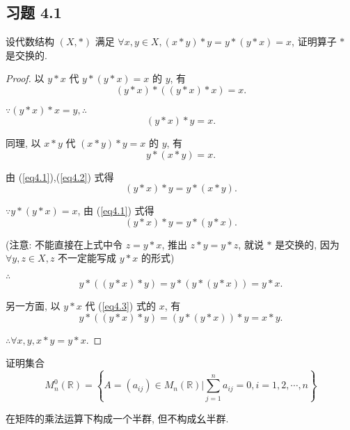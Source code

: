 \documentclass{ctexart}
\begin{document}
\subsection{习题 4.1}
\begin{exercise}[1.1]
    设代数结构 $(X,*)$ 满足 $\forall x,y\in X,(x*y)*y=y*(y*x)=x$, 证明算子 $*$ 是交换的.
\end{exercise}
\begin{proof}
    以 $y*x$ 代 $y*(y*x)=x$ 的 $y$, 有
    \[(y*x)*((y*x)*x)=x.\]

    $\because(y*x)*x=y,\therefore$
    \begin{equation}\label{eq4.1}
        (y*x)*y=x.
    \end{equation}

    同理, 以 $x*y$ 代 $(x*y)*y=x$ 的 $y$, 有
    \begin{equation}\label{eq4.2}
        y*(x*y)=x.
    \end{equation}

    由 (\ref{eq4.1}),(\ref{eq4.2}) 式得
    \begin{equation}\label{eq4.3}
        (y*x)*y=y*(x*y).
    \end{equation}

    $\because y*(y*x)=x$, 由 (\ref{eq4.1}) 式得
    \[(y*x)*y=y*(y*x).\]

    (注意: 不能直接在上式中令 $z=y*x$, 推出 $z*y=y*z$, 就说 $*$ 是交换的, 因为 $\forall y,z\in X,z$ 不一定能写成 $y*x$ 的形式)

    $\therefore$
    \[y*((y*x)*y)=y*(y*(y*x))=y*x.\]

    另一方面, 以 $y*x$ 代 (\ref{eq4.3}) 式的 $x$, 有
    \[y*((y*x)*y)=(y*(y*x))*y=x*y.\]

    $\therefore\forall x,y,x*y=y*x$.
\end{proof}
\begin{exercise}[1.2]
    证明集合
    \[M_n^0(\mathbb{R})=\left\{A=(a_{ij})\in M_n(\mathbb{R})\Bigg|\sum\limits_{j=1}^{n}a_{ij}=0,i=1,2,\cdots,n\right\}\]

    在矩阵的乘法运算下构成一个半群, 但不构成幺半群.
\end{exercise}
\end{document}
